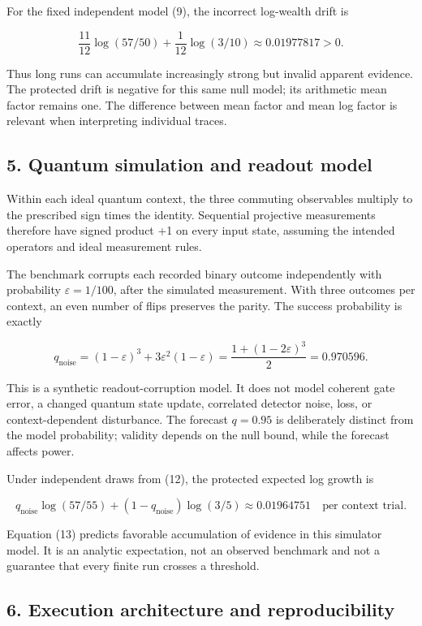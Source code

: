 \documentclass[10pt,a4paper]{article}
\begin{document}
For the fixed independent model (9), the incorrect log-wealth drift is

\[
\frac{11}{12}\log(57/50)+\frac1{12}\log(3/10)
\approx0.01977817>0. \tag{11}
\]

Thus long runs can accumulate increasingly strong but invalid apparent
evidence. The protected drift is negative for this same null model; its
arithmetic mean factor remains one. The difference between mean factor
and mean log factor is relevant when interpreting individual traces.

\subsection{5. Quantum simulation and readout
model}\label{quantum-simulation-and-readout-model}

Within each ideal quantum context, the three commuting observables
multiply to the prescribed sign times the identity. Sequential
projective measurements therefore have signed product +1 on every input
state, assuming the intended operators and ideal measurement rules.

The benchmark corrupts each recorded binary outcome independently with
probability \(\varepsilon=1/100\), after the simulated measurement. With
three outcomes per context, an even number of flips preserves the
parity. The success probability is exactly

\[
q_{\mathrm{noise}}
=(1-\varepsilon)^3+3\varepsilon^2(1-\varepsilon)
=\frac{1+(1-2\varepsilon)^3}{2}
=0.970596. \tag{12}
\]

This is a synthetic readout-corruption model. It does not model coherent
gate error, a changed quantum state update, correlated detector noise,
loss, or context-dependent disturbance. The forecast \(q=0.95\) is
deliberately distinct from the model probability; validity depends on
the null bound, while the forecast affects power.

Under independent draws from (12), the protected expected log growth is

\[
q_{\mathrm{noise}}\log(57/55)
+(1-q_{\mathrm{noise}})\log(3/5)
\approx0.01964751
\quad\text{per context trial}. \tag{13}
\]

Equation (13) predicts favorable accumulation of evidence in this
simulator model. It is an analytic expectation, not an observed
benchmark and not a guarantee that every finite run crosses a threshold.

\subsection{6. Execution architecture and
reproducibility}\label{execution-architecture-and-reproducibility}
\end{document}
